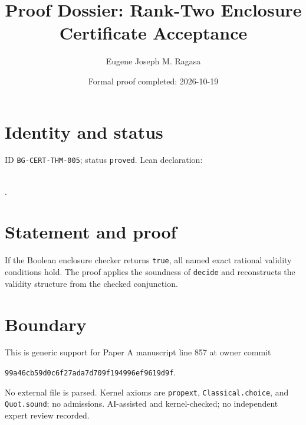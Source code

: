 \documentclass[11pt]{article}
\title{Proof Dossier: Rank-Two Enclosure Certificate Acceptance}\author{Eugene Joseph M. Ragasa}\date{Formal proof completed: 2026-10-19}
\begin{document}
\maketitle
\section{Identity and status}
ID \texttt{BG-CERT-THM-005}; status \texttt{proved}. Lean declaration:
\par{}\\
{\tiny{}}.
\section{Statement and proof}
If the Boolean enclosure checker returns \texttt{true}, all named exact rational validity
conditions hold. The proof applies the soundness of \texttt{decide} and reconstructs the
validity structure from the checked conjunction.
\section{Boundary}
This is generic support for Paper A manuscript line 857 at owner commit
\begin{center}\small\texttt{99a46cb59d0c6f27ada7d709f194996ef9619d9f}.\end{center}
No external file is parsed. Kernel axioms are \texttt{propext},
\texttt{Classical.choice}, and \texttt{Quot.sound}; no admissions. AI-assisted and
kernel-checked; no independent expert review recorded.
\end{document}
